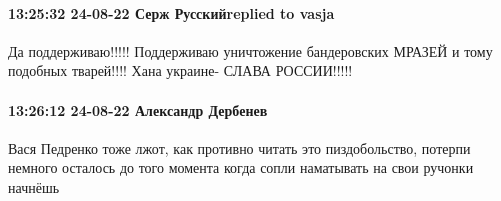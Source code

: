  
 
 
 
 

\paragraph{13:25:32 24-08-22 Серж Русскийreplied to vasja}

Да поддерживаю!!!!! Поддерживаю уничтожение бандеровских МРАЗЕЙ и тому подобных
тварей!!!! Хана украине- СЛАВА РОССИИ!!!!!

\paragraph{13:26:12 24-08-22 Александр Дербенев}

Вася Педренко тоже лжот, как противно читать это пиздобольство, потерпи немного
осталось до того момента когда сопли наматывать на свои ручонки начнёшь
